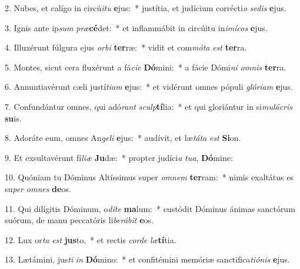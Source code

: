 2. Nubes, et calígo in circú\textit{i}\textit{tu} \textbf{e}jus:~*  justítia, et judícium corrécti\textit{o} \textit{se}\textit{dis} \textbf{e}jus.\

3. Ignis ante ip\textit{sum} \textit{præ}\textbf{cé}det:~*  et inflammábit in circúitu in\textit{i}\textit{mí}\textit{cos} \textbf{e}jus.\

4. Illuxérunt fúlgura ejus \textit{or}\textit{bi} \textbf{ter}ræ:~*  vidit et com\textit{mó}\textit{ta} \textit{est} \textbf{ter}ra.\

5. Montes, sicut cera fluxérunt a fá\textit{ci}\textit{e} \textbf{Dó}mini:~*  a fácie Dómi\textit{ni} \textit{om}\textit{nis} \textbf{ter}ra.\

6. Annuntiavérunt cæli justí\textit{ti}\textit{am} \textbf{e}jus:~*  et vidérunt omnes pópuli \textit{gló}\textit{ri}\textit{am} \textbf{e}jus.\

7. Confundántur omnes, qui adó\textit{rant} \textit{sculp}\textbf{tí}lia:~*  et qui gloriántur in si\textit{mu}\textit{lá}\textit{cris} \textbf{su}is.\

8. Adoráte eum, omnes An\textit{ge}\textit{li} \textbf{e}jus:~*  audívit, et læ\textit{tá}\textit{ta} \textit{est} \textbf{Si}on.\

9. Et exsultavérunt fí\textit{li}\textit{æ} \textbf{Ju}dæ:~*  propter judíci\textit{a} \textit{tu}\textit{a}, \textbf{Dó}mine:\

10. Quóniam tu Dóminus Altíssimus super \textit{om}\textit{nem} \textbf{ter}ram:~*  nimis exaltátus es su\textit{per} \textit{om}\textit{nes} \textbf{de}os.\

11. Qui dilígitis Dóminum, o\textit{dí}\textit{te} \textbf{ma}lum:~*  custódit Dóminus ánimas sanctórum suórum, de manu peccatóris li\textit{be}\textit{rá}\textit{bit} \textbf{e}os.\

12. Lux or\textit{ta} \textit{est} \textbf{jus}to,~*  et rectis \textit{cor}\textit{de} \textit{læ}\textbf{tí}tia.\

13. Lætámini, jus\textit{ti} \textit{in} \textbf{Dó}mino:~*  et confitémini memóriæ sanctifica\textit{ti}\textit{ó}\textit{nis} \textbf{e}jus.\

